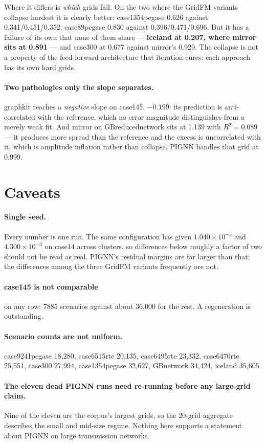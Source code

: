 \documentclass[10pt]{article}
\begin{document}
Where it differs is \emph{which} grids fail. On the two where the GridFM
variants collapse hardest it is clearly better: case1354pegase 0.626 against
0.341/0.451/0.352, case89pegase 0.830 against 0.396/0.471/0.696. But it has a
failure of its own that none of them share --- \textbf{iceland at 0.207, where
mirror sits at 0.891} --- and case300 at 0.677 against mirror's 0.929. The
collapse is not a property of the feed-forward architecture that iteration
cures; each approach has its own hard grids.

\paragraph{Two pathologies only the slope separates.} graphkit reaches a
\emph{negative} slope on case145, $-0.199$: its prediction is anti-correlated
with the reference, which no error magnitude distinguishes from a merely weak
fit. And mirror on GBreducednetwork sits at 1.139 with $R^2 = 0.089$ --- it
produces more spread than the reference and the excess is uncorrelated with it,
which is amplitude inflation rather than collapse. PIGNN handles that grid at
0.999.


\section{Caveats}

\paragraph{Single seed.} Every number is one run. The same configuration has
given $1.040\times10^{-3}$ and $4.300\times10^{-3}$ on case14 across clusters,
so differences below roughly a factor of two should not be read as real. PIGNN's
residual margins are far larger than that; the differences among the three
GridFM variants frequently are not.

\paragraph{case145 is not comparable} on any row: 7885 scenarios against about
36{,}000 for the rest. A regeneration is outstanding.

\paragraph{Scenario counts are not uniform.} case9241pegase 18{,}280,
case6515rte 20{,}135, case6495rte 23{,}332, case6470rte 25{,}551, case300
27{,}994, case1354pegase 32{,}627, GBnetwork 34{,}424, iceland 35{,}605.

\paragraph{The eleven dead PIGNN runs need re-running before any large-grid
claim.} Nine of the eleven are the corpus's largest grids, so the 20-grid
aggregate describes the small and mid-size regime. Nothing here supports a
statement about PIGNN on large transmission networks.
\end{document}
